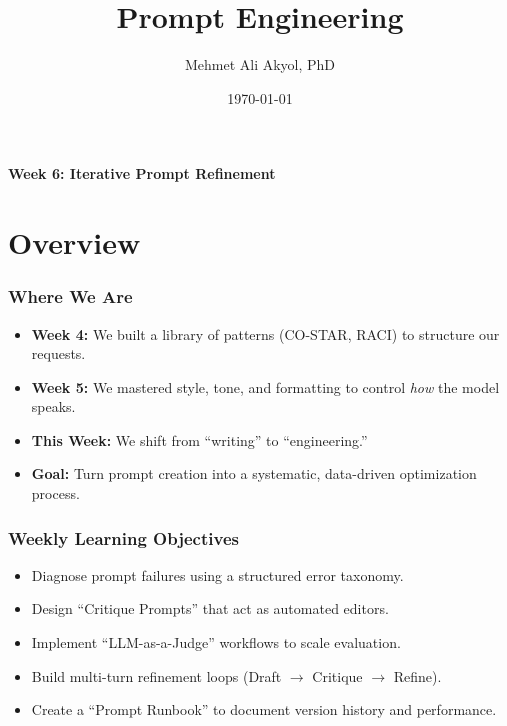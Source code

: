 \documentclass{beamer}
\title{Prompt Engineering}
\author{Mehmet Ali Akyol, PhD}
\institute{Ankara Medipol University}
\date{\today}
\begin{document}
\begin{frame}
    \titlepage
    \begin{center}
        \vspace{1cm}
        \textbf{Week 6: Iterative Prompt Refinement}
    \end{center}
\end{frame}

\section{Overview}

\begin{frame}
    \frametitle{Where We Are}
    \begin{itemize}
        \item \textbf{Week 4:} We built a library of patterns (CO-STAR, RACI) to structure our requests.
        \item \textbf{Week 5:} We mastered style, tone, and formatting to control \textit{how} the model speaks.
        \item \textbf{This Week:} We shift from ``writing'' to ``engineering.''
        \item \textbf{Goal:} Turn prompt creation into a systematic, data-driven optimization process.
    \end{itemize}
\end{frame}

\begin{frame}
    \frametitle{Weekly Learning Objectives}
    \begin{itemize}
        \item Diagnose prompt failures using a structured error taxonomy.
        \item Design ``Critique Prompts'' that act as automated editors.
        \item Implement ``LLM-as-a-Judge'' workflows to scale evaluation.
        \item Build multi-turn refinement loops (Draft $\to$ Critique $\to$ Refine).
        \item Create a ``Prompt Runbook'' to document version history and performance.
    \end{itemize}
\end{frame}
\end{document}
